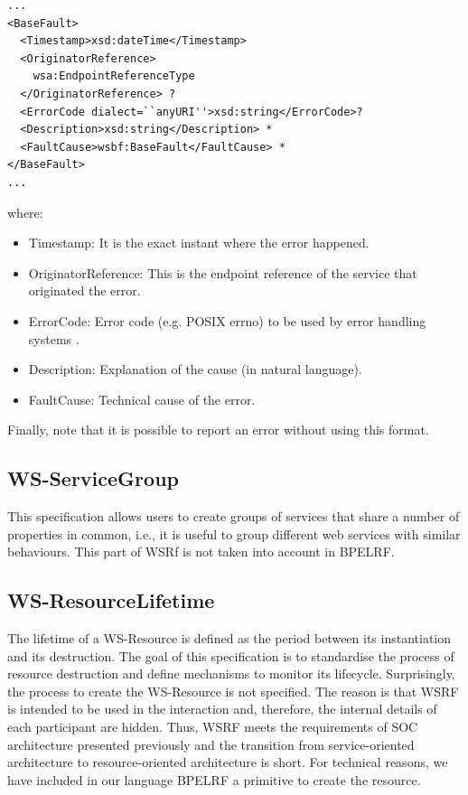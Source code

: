 \lstset{language=XML, numbersep=5pt, frame=single}
\begin{lstlisting}
...
<BaseFault> 
  <Timestamp>xsd:dateTime</Timestamp> 
  <OriginatorReference> 
    wsa:EndpointReferenceType 
  </OriginatorReference> ? 
  <ErrorCode dialect=``anyURI''>xsd:string</ErrorCode>? 
  <Description>xsd:string</Description> * 
  <FaultCause>wsbf:BaseFault</FaultCause> * 
</BaseFault>
...
\end{lstlisting}
where:

\begin{itemize}
\item Timestamp: It is the exact instant where the error happened.
\item OriginatorReference: This is the endpoint reference of the service that originated the error.
\item ErrorCode: Error code (e.g. POSIX errno) to be used by error handling systems .
\item Description: Explanation of the cause (in natural language).
\item FaultCause: Technical cause of the error. 
\end{itemize}
Finally, note that it is possible to report an error without using this format. %
\subsection{WS-ServiceGroup}
This specification allows users to create groups of services 
that share a number of properties in common, i.e., it is useful to group different web services with similar behaviours.
This part of WSRf is not taken into account in BPELRF.

\subsection{WS-ResourceLifetime}
The lifetime of a WS-Resource is defined as the period between its instantiation and its destruction. 
The goal of this specification is to standardise the process of resource destruction
and define mechanisms to monitor its lifecycle. Surprisingly, the process to create the WS-Resource
is not specified. The reason is that WSRF is intended to be used in the interaction and, therefore, the 
internal details of each participant are hidden. Thus, WSRF meets the requirements of SOC
architecture presented previously and the transition from service-oriented architecture to resource-oriented
architecture is short. For technical reasons, we have included in our language
BPELRF a primitive to create the resource. 

